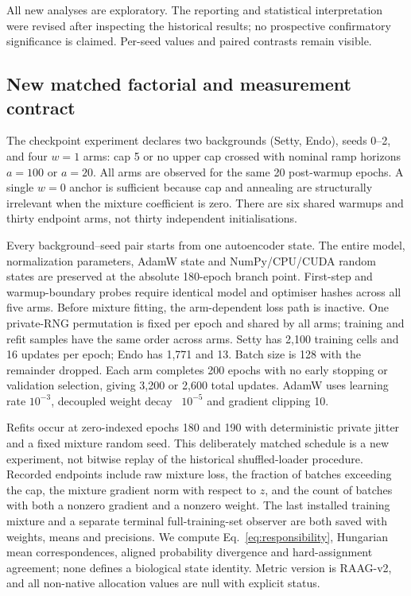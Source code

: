 \documentclass[11pt]{article}
\begin{document}
All new analyses are exploratory. The reporting and statistical interpretation were revised after inspecting the historical results; no prospective confirmatory significance is claimed. Per-seed values and paired contrasts remain visible.

\subsection{New matched factorial and measurement contract}
The checkpoint experiment declares two backgrounds (Setty, Endo), seeds 0--2, and four $w=1$
arms: cap 5 or no upper cap crossed with nominal ramp horizons $a=100$ or $a=20$. All arms are observed for the same 20 post-warmup epochs. A single $w=0$
anchor is sufficient because cap and annealing are structurally irrelevant
when the mixture coefficient is zero. There are six shared warmups and
thirty endpoint arms, not thirty independent initialisations.

Every background--seed pair starts from one autoencoder state. The entire
model, normalization parameters, AdamW state and NumPy/CPU/CUDA random
states are preserved at the absolute 180-epoch branch point. First-step and
warmup-boundary probes require identical model and optimiser hashes across
all five arms. Before mixture fitting, the arm-dependent loss path is inactive.
One private-RNG permutation is fixed per epoch and shared by all arms;
training and refit samples have the same order across arms. Setty has 2,100
training cells and 16 updates per epoch; Endo has 1,771 and 13. Batch size is
128 with the remainder dropped. Each arm completes 200 epochs with no early
stopping or validation selection, giving 3,200 or 2,600 total updates. AdamW
uses learning rate $10^{-3}$, decoupled weight decay~\cite{loshchilov2019decoupled} $10^{-5}$ and gradient clipping 10.

Refits occur at zero-indexed epochs 180 and 190 with deterministic private
jitter and a fixed mixture random seed. This deliberately matched schedule
is a new experiment, not bitwise replay of the historical shuffled-loader
procedure. Recorded endpoints include raw mixture loss, the fraction of
batches exceeding the cap, the mixture gradient norm with respect to $z$,
and the count of batches with both a nonzero gradient and a nonzero weight.
The last installed training mixture and a separate terminal full-training-set
observer are both saved with weights, means and precisions. We compute
Eq.~\ref{eq:responsibility}, Hungarian mean correspondences\cite{kuhn1955hungarian}, aligned
probability divergence and hard-assignment agreement; none defines a
biological state identity. Metric version is RAAG-v2, and all non-native
allocation values are null with explicit status.
\end{document}
